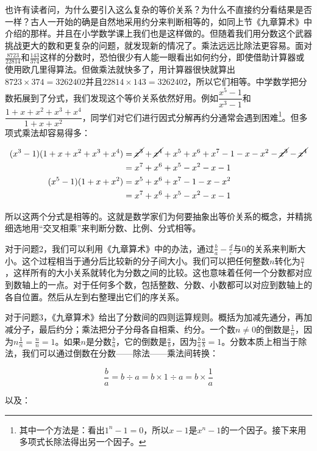 \documentclass[b5paper]{ctexart}
\begin{document}
也许有读者问，为什么要引入这么复杂的等价关系？为什么不直接约分看结果是否一样？古人一开始的确是自然地采用约分来判断相等的，如同上节《九章算术》中介绍的那样。并且在小学数学课上我们也是这样做的。但随着我们用分数这个武器挑战更大的数和更复杂的问题，就发现新的情况了。乘法远远比除法更容易。面对$\frac{8723}{22814}$和$\frac{143}{374}$这样的分数时，恐怕很少有人能一眼看出如何约分，即使借助计算器或使用欧几里得算法。但做乘法就快多了，用计算器很快就算出$8723 \times 374 = 3262402$并且$22814 \times 143 = 3262402$，所以它们相等。中学数学把分数拓展到了分式，我们发现这个等价关系依然好用。例如$\dfrac{x^5 - 1}{x^3 - 1}$和$\dfrac{1 + x + x^2 + x^3 + x^4}{1 + x + x^2}$，同学们对它们进行因式分解再约分通常会遇到困难\footnote{其中一个方法是：看出$1^n - 1 = 0$，所以$x-1$是$x^n-1$的一个因子。接下来用多项式长除法得出另一个因子。}。但多项式乘法却容易得多：

\begin{align*}
(x^3 - 1)(1 + x + x^2 + x^3 + x^4) &= \cancel{x^3} + \cancel{x^4} + x^5 + x^6 + x^7 - 1 - x - x^2 - \cancel{x^3} - \cancel{x^4} \\
  &= x^7 + x^6 + x^5 - x^2 - x - 1 \\
(x^5 - 1)(1 + x + x^2) &= x^5 + x^6 + x^7 - 1 - x - x^2 \\
  &= x^7 + x^6 + x^5 - x^2 - x - 1
\end{align*}

所以这两个分式是相等的。这就是数学家们为何要抽象出等价关系的概念，并精挑细选地用“交叉相乘”来判断分数、比例、分式相等。

\vspace{3mm}
对于问题2，我们可以利用《九章算术》中的办法，通过$\frac{b}{a} - \frac{d}{c}$与0的关系来判断大小。这个过程相当于通分后比较新的分子间大小。我们可以把任何整数$n$转化为$\frac{n}{1}$，这样所有的大小关系就转化为分数之间的比较。这也意味着任何一个分数都对应到数轴上的一点。对于任何多个数，包括整数、分数、小数都可以对应到数轴上的各自位置。然后从左到右整理出它们的序关系。

\vspace{3mm}
对于问题3，《九章算术》给出了分数间的四则运算规则。概括为加减先通分，再加减分子，最后约分；乘法把分子分母各自相乘、约分。一个数$n \ne 0$的倒数是$\frac{1}{n}$，因为$n\frac{1}{n} = \frac{n}{n} = 1$。如果$n$是分数$\frac{b}{a}$，它的倒数是$\frac{a}{b}$，因为$\frac{b}{a}\frac{a}{b} = 1$。分数本质上相当于除法，我们可以通过倒数在分数——除法——乘法间转换：

\[
\frac{b}{a} = b \div a = b \times 1 \div a = b \times \frac{1}{a}
\]

以及：
\end{document}
